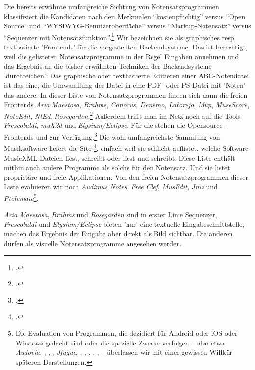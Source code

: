 Die bereits erwähnte umfangreiche Sichtung von Notensatzprogrammen klassifiziert
die Kandidaten nach den Merkmalen \enquote{kostenpflichtig} versus \enquote{Open
Source} und \enquote{WYSIWYG-Benutzeroberfläche} versus
\enquote{Markup-Notensatz} versus \enquote{Sequenzer mit
Notensatzfunktion}.\footcite[vgl.][\nopage wp]{WpedNotensatz2019a} Wir
bezeichnen sie als graphisches resp. textbasierte 'Frontends' für die
vorgestellten Backendsysteme. Das ist berechtigt, weil die gelisteten
Notensatzprogramme in der Regel Eingaben annehmen und das Ergebnis an die bisher
erwähnten Techniken der Backendsysteme 'durchreichen': Das graphische oder
textbadierte Editieren einer ABC-Notendatei ist das eine, die Umwandlung der
Datei in eine PDF- oder PS-Datei mit 'Noten' das andere. In dieser Liste von
Notensatzprogrammen finden sich dann die freien Frontends \textit{Aria
Maestosa}, \textit{Brahms}, \textit{Canorus}, \textit{Denemo},
\textit{Laborejo}, \textit{Mup}, \textit{MuseScore}, \textit{NoteEdit},
\textit{NtEd}, \textit{Rosegarden}.\footcite[vgl.][\nopage
wp]{WpedNotensatz2019a} Außerdem trifft man im Netz noch auf die Tools
\textit{Frescobaldi}, \textit{muX2d} und \textit{Elysium/Eclipse}. Für die
 stehen die Opensource-Frontends  und
 zur Verfügung.\footcite[vgl.][\nopage wp]{Abc2018b} Die wohl
umfangreichste Sammlung von Musiksoftware liefert die Site
\footcite[vgl.][\nopage wp]{MusicXML2018b}, einfach weil sie
schlicht auflistet, welche Software MusicXML-Dateien liest, schreibt oder liest
und schreibt. Diese Liste enthält mithin auch andere Programme als solche für
den Notensatz. Und sie listet proprietäre und freie Applikationen. Von den
freien Notensatzprogrammen dieser Liste evaluieren wir noch \textit{Audimus
Notes}, \textit{Free Clef}, \textit{MusEdit}, \textit{Jniz} und
\textit{Ptolemaic}\footnote{Die Evaluation von Programmen, die dezidiert für
Android oder iOS oder Windows gedacht sind oder die spezielle Zwecke verfolgen
-- also etwa \textit{Audovia}, , , ,
\textit{Jfugue}, , , ,
, ,  -- überlassen wir
mit einer gewissen Willkür späteren Darstellungen.}.


\textit{Aria Maestosa}, \textit{Brahms} und \textit{Rosegarden}
sind in erster Linie \textsf{Sequenzer}, \textit{Frescobaldi} und
\textit{Elysium/Eclipse} bieten 'nur' eine textuelle Eingabeschnittstelle,
machen das Ergebnis der Eingabe aber direkt als Bild sichtbar. Die anderen
dürfen als visuelle Notensatzprogramme angesehen werden.


